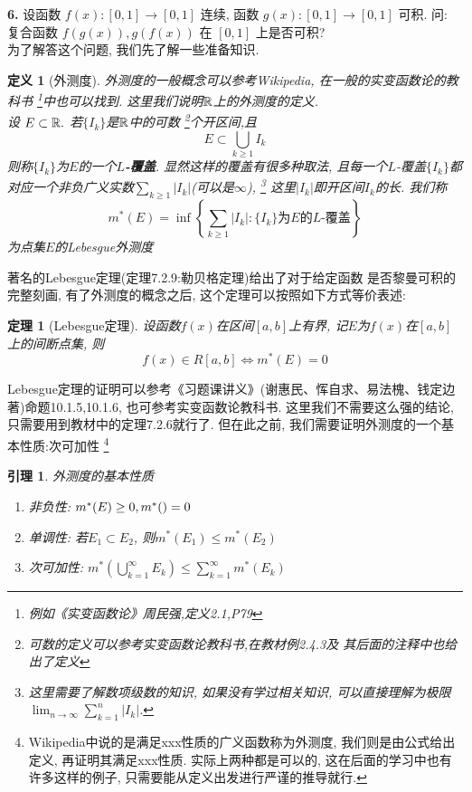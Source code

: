 \documentclass[a4paper,12pt]{article}
\theoremstyle{nonumberplain}
\newtheorem{definition}{定义}
\newtheorem{theorem}{定理}
\newtheorem{lemma}{引理}
\begin{document}
\noindent \textbf{6.} 设函数 $f(x):[0,1]\to [0,1]$ 连续, 函数 $g(x):[0,1]\to [0,1]$ 可积. 
问: 复合函数 $f(g(x)),g(f(x))$ 在 $[0,1]$ 上是否可积?\\

为了解答这个问题, 我们先了解一些准备知识.
\begin{definition}[外测度]
  外测度的一般概念可以参考Wikipedia, 在一般的实变函数论的教科书
  \footnote{例如《实变函数论》周民强,定义2.1,P79}中也可以找到. 
  这里我们说明$\mathbb{R}$上的外测度的定义. \\
  设 $E\subset \mathbb{R}.$ 若$\{I_k\}$是$\mathbb{R}$中的可数
  \footnote{可数的定义可以参考实变函数论教科书,在教材例2.4.3及
  其后面的注释中也给出了定义}个开区间,且
  \[E\subset\bigcup_{k\geq1}I_k\]
  则称$\{I_k\}$为$E$的一个\textbf{$L$-覆盖}. 显然这样的覆盖有很多种取法, 
  且每一个$L$-覆盖$\{I_k\}$都对应一个非负广义实数$\sum_{k\geq1}|I_k|$(可以是$\infty$), 
  \footnote{这里需要了解数项级数的知识, 如果没有学过相关知识, 
  可以直接理解为极限$\lim_{n\to\infty}\sum_{k=1}^{n}|I_k|$.}
  这里$|I_k|$即开区间$I_k$的长. 我们称
  \[m^*(E)=\inf\left\{\sum_{k\geq1}|I_k|:\{I_k\}\text{为}E\text{的}L\text{-覆盖}\right\}\]
  为点集$E$的Lebesgue外测度
\end{definition}
著名的Lebesgue定理(定理7.2.9:勒贝格定理)给出了对于给定函数
是否黎曼可积的完整刻画, 有了外测度的概念之后, 这个定理可以按照如下方式等价表述:
\begin{theorem}[Lebesgue定理]
  设函数$f(x)$在区间$[a,b]$上有界, 记$E$为$f(x)$在$[a,b]$上的间断点集, 则
  \[f(x)\in R[a,b]\Leftrightarrow m^*(E)=0\]
\end{theorem}
Lebesgue定理的证明可以参考《习题课讲义》(谢惠民、恽自求、易法槐、钱定边著)命题10.1.5,10.1.6, 
也可参考实变函数论教科书. 这里我们不需要这么强的结论, 只需要用到教材中的定理7.2.6就行了.
但在此之前, 我们需要证明外测度的一个基本性质:次可加性
\footnote{Wikipedia中说的是满足xxx性质的广义函数称为外测度, 我们则是由公式给出定义, 再证明其满足xxx性质.
实际上两种都是可以的, 这在后面的学习中也有许多这样的例子, 只需要能从定义出发进行严谨的推导就行.}
\begin{lemma}外测度的基本性质
  \begin{enumerate}
    \item 非负性: $m^*(E)\geq0,m^*(\empty)=0$
    \item 单调性: 若$E_1\subset E_2$, 则$m^*(E_1)\leq m^*(E_2)$
    \item 次可加性: $m^*(\bigcup_{k=1}^\infty E_k)\leq \sum_{k=1}^{\infty}m^*(E_k)$
  \end{enumerate}
\end{lemma}
\end{document}
